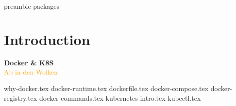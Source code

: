 \RequirePackage{import}
{preamble}
{packages}


\section{Introduction}\label{sec:introduction}

\begin{frame}[c]
    \centering
    \Huge
    \textbf{Docker \& K8S}
    \\
    \vspace{1ex}
    \Large
    \textcolor{orange}{Ab in den Wolken}
\end{frame}
{why-docker.tex}
{docker-runtime.tex}
{dockerfile.tex}
{docker-compose.tex}
{docker-registry.tex}
{docker-commands.tex}
{kubernetes-intro.tex}
{kubectl.tex}


